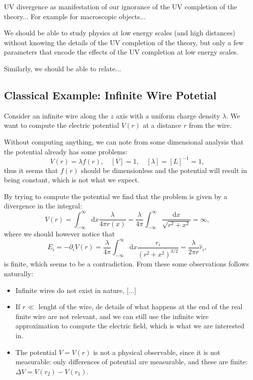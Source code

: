 UV divergence as manifestation of our ignorance of the UV completion of the theory...
For example for macroscopic objects...

We should be able to study physics at low energy scales (and high distances) without knowing the details of the UV completion of the theory, but only a few parameters that encode the effects of the UV completion at low energy scales.

Similarly, we should be able to relate...

\subsection{Classical Example: Infinite Wire Potetial}

Consider an infinite wire along the \(z\) axis with a uniform charge density \(\lambda\). We want to compute the electric potential \(V(r)\) at a distance \(r\) from the wire.

Without computing anything, we can note from some dimensional analysis that the potential already has some problems:
\[
    V(r) = \lambda f(r), \quad [V] = 1, \quad [\lambda] = [L]^{-1} = 1,
\]
thus it seems that \(f(r)\) should be dimensionless and the potential will result in being constant, which is not what we expect.

By trying to compute the potential we find that the problem is given by a divergence in the integral:
\[
    V(r) = \int_{-\infty}^{\infty} \mathrm{d} x \frac{\lambda}{4 \pi r(x)} = \frac{\lambda}{4 \pi} \int_{-\infty}^{\infty} \frac{\mathrm{d} x}{\sqrt{r^2 + x^2}} = \infty,
\]
where we should however notice that
\[
    E_i = - \partial_i V(r) = \frac{\lambda}{4 \pi} \int_{-\infty}^{\infty} \mathrm{d} x \frac{r_i}{(r^2 + x^2)^{3/2}} = \frac{\lambda}{2 \pi r} \hat{r}_i,
\]
is finite, which seems to be a contradiction. From these some observations follows naturally:
\begin{itemize}
    \item Infinite wires do not exist in nature, [...]
    \item If \(r \ll \) lenght of the wire, de details of what happens at the end of the real finite wire are not relevant, and we can still use the infinite wire approximation to compute the electric field, which is what we are interested in.
    \item The potential \(V = V(r)\) is not a physical observable, since it is not measurable: only differences of potential are measurable, and these are finite: \(\Delta V = V(r_2) - V(r_1)\).
\end{itemize}

